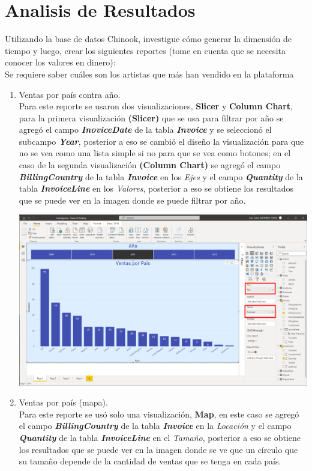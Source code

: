 \documentclass[12pt,letterpaper]{article}
\newcommand\tab[1][1cm]{\hspace*{#1}}
\begin{document}
    \section{Analisis de Resultados}
    Utilizando la base de datos Chinook, investigue cómo generar la dimensión de tiempo y luego, crear los siguientes reportes (tome en cuenta que se necesita conocer los valores en dinero):\\[0.1in]
    Se requiere saber cuáles son los artistas que más han vendido en la plataforma
    \begin{enumerate}[\tab 1.]
        \item Ventas por país contra año.\\[0.1in]
        Para este reporte se usaron dos visualizaciones, \textbf{Slicer} y \textbf{Column Chart}, para la primera visualización \textbf{(Slicer)} que se usa para filtrar por año se agregó el campo \textit{\textbf{InoviceDate}} de la tabla \textit{\textbf{Invoice}} y se seleccionó el subcampo \textit{\textbf{Year}}, posterior a eso se cambió el diseño la visualización para que no se vea como una lista simple si no para que se vea como botones; en el caso de la segunda visualización \textbf{(Column Chart)} se agregó el campo \textit{\textbf{BillingCountry}} de la tabla \textit{\textbf{Invoice}} en los \textit{Ejes} y el campo \textit{\textbf{Quantity}} de la tabla \textit{\textbf{InvoiceLine}} en los \textit{Valores}, posterior a eso se obtiene los resultados que se puede ver en la imagen donde se puede filtrar por año.
        \begin{center}
            \includegraphics[width=13cm]{./img/img20.png}
        \end{center}
        \item Ventas por país (mapa).\\[0.1in]
        Para este reporte se usó solo una visualización, \textbf{Map}, en este caso se agregó el campo \textit{\textbf{BillingCountry}} de la tabla \textit{\textbf{Invoice}} en la \textit{Locación} y el campo \textit{\textbf{Quantity}} de la tabla \textit{\textbf{InvoiceLine}} en el \textit{Tamaño}, posterior a eso se obtiene los resultados que se puede ver en la imagen donde se ve que un círculo que su tamaño depende de la cantidad de ventas que se tenga en cada país.

\end{enumerate}
\end{document}
